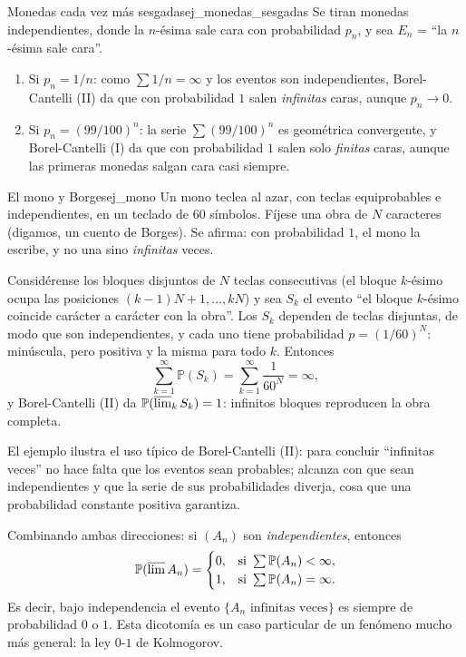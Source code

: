 \documentclass[11pt, a4paper]{article}
\begin{document}
\begin{ejemplo}{Monedas cada vez más sesgadas}{ej_monedas_sesgadas}
Se tiran monedas independientes, donde la $n$-ésima sale cara con probabilidad $p_n$, y sea
$E_n$ = ``la $n$-ésima sale cara''.
\begin{enumerate}
    \item Si $p_n = 1/n$: como $\sum 1/n = \infty$ y los eventos son independientes,
    Borel-Cantelli (II) da que con probabilidad $1$ salen \emph{infinitas} caras, aunque
    $p_n \to 0$.
    \item Si $p_n = (99/100)^n$: la serie $\sum (99/100)^n$ es geométrica convergente, y
    Borel-Cantelli (I) da que con probabilidad $1$ salen solo \emph{finitas} caras, aunque las
    primeras monedas salgan cara casi siempre.
\end{enumerate}
\end{ejemplo}

\begin{ejemplo}{El mono y Borges}{ej_mono}
Un mono teclea al azar, con teclas equiprobables e independientes, en un teclado de $60$
símbolos. Fíjese una obra de $N$ caracteres (digamos, un cuento de Borges). Se afirma: con
probabilidad $1$, el mono la escribe, y no una sino \emph{infinitas} veces.

Considérense los bloques disjuntos de $N$ teclas consecutivas (el bloque $k$-ésimo ocupa las
posiciones $(k-1)N + 1, \dots, kN$) y sea $S_k$ el evento ``el bloque $k$-ésimo coincide
carácter a carácter con la obra''. Los $S_k$ dependen de teclas disjuntas, de modo que son
independientes, y cada uno tiene probabilidad $p = (1/60)^N$: minúscula, pero positiva y la
misma para todo $k$. Entonces
$$ \sum_{k=1}^\infty \mathbb{P}(S_k) = \sum_{k=1}^\infty \frac{1}{60^N} = \infty, $$
y Borel-Cantelli (II) da $\mathbb{P}(\varlimsup_k S_k) = 1$: infinitos bloques reproducen la
obra completa.
\end{ejemplo}

\obs El ejemplo ilustra el uso típico de Borel-Cantelli (II): para concluir ``infinitas
veces'' no hace falta que los eventos sean probables; alcanza con que sean independientes y que
la serie de sus probabilidades diverja, cosa que una probabilidad constante positiva garantiza.

\obs Combinando ambas direcciones: si $(A_n)$ son \emph{independientes}, entonces
$$ \mathbb{P}(\varlimsup A_n) = \begin{cases} 0, & \text{si } \sum \mathbb{P}(A_n) < \infty, \\
1, & \text{si } \sum \mathbb{P}(A_n) = \infty. \end{cases} $$
Es decir, bajo independencia el evento $\{A_n \text{ infinitas veces}\}$ es siempre de
probabilidad $0$ o $1$. Esta dicotomía es un caso particular de un fenómeno mucho más
general: la ley $0$-$1$ de Kolmogorov.
\end{document}

